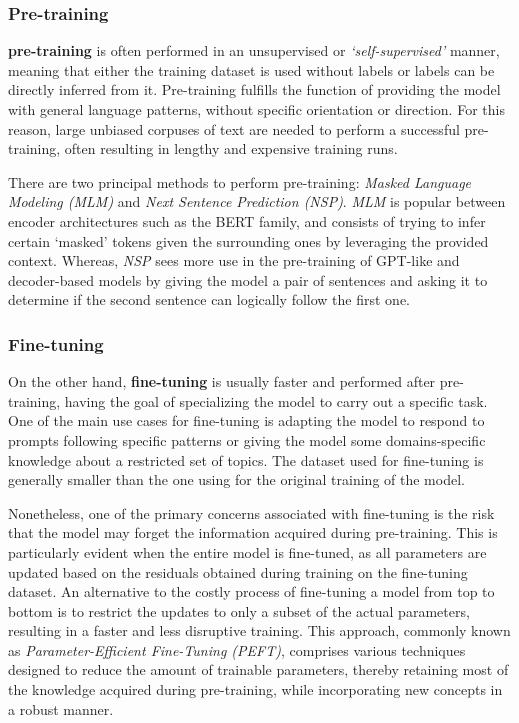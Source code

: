 \subsubsection*{Pre-training}

\textbf{pre-training} is often performed in an unsupervised or \emph{`self-supervised'} manner, meaning that either the training dataset is used without labels or labels can be directly inferred from it.
Pre-training fulfills the function of providing the model with general language patterns, without specific orientation or direction.
For this reason, large unbiased corpuses of text are needed to perform a successful pre-training, often resulting in lengthy and expensive training runs.

There are two principal methods to perform pre-training: \emph{Masked Language Modeling (MLM)} and \emph{Next Sentence Prediction (NSP)}.
\emph{MLM} is popular between encoder architectures such as the BERT family, and consists of trying to infer certain `masked' tokens given the surrounding ones by leveraging the provided context.
Whereas, \emph{NSP} sees more use in the pre-training of GPT-like and decoder-based models by giving the model a pair of sentences and asking it to determine if the second sentence can logically follow the first one.

\subsubsection*{Fine-tuning}

On the other hand, \textbf{fine-tuning} is usually faster and performed after pre-training, having the goal of specializing the model to carry out a specific task.
One of the main use cases for fine-tuning is adapting the model to respond to prompts following specific patterns or giving the model some domains-specific knowledge about a restricted set of topics.
The dataset used for fine-tuning is generally smaller than the one using for the original training of the model.

Nonetheless, one of the primary concerns associated with fine-tuning is the risk that the model may forget the information acquired during pre-training.
This is particularly evident when the entire model is fine-tuned, as all parameters are updated based on the residuals obtained during training on the fine-tuning dataset.
An alternative to the costly process of fine-tuning a model from top to bottom is to restrict the updates to only a subset of the actual parameters, resulting in a faster and less disruptive training.
This approach, commonly known as \emph{Parameter-Efficient Fine-Tuning (PEFT)}, comprises various techniques designed to reduce the amount of trainable parameters, thereby retaining most of the knowledge acquired during pre-training, while incorporating new concepts in a robust manner.
